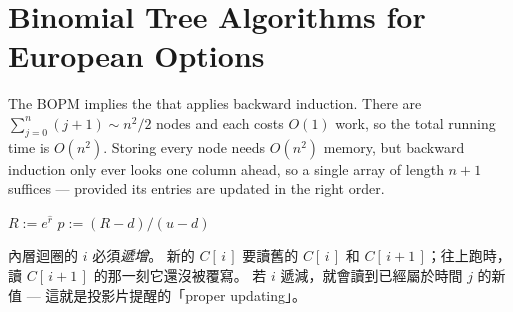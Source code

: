 \section{Binomial Tree Algorithms for European Options}
\label{sec:bopm-algorithms}


The BOPM implies the  that applies backward induction.
There are $\sum_{j=0}^{n}(j+1)\sim n^{2}/2$ nodes and each costs $O(1)$ work, so the total running time is $O(n^{2})$.
Storing every node needs $O(n^{2})$ memory, but backward induction only ever looks one column ahead, so a single array of length $n+1$ suffices --- provided its entries are updated in the right order.

\suppstart
\begin{algorithm}[H]
	\caption{Binomial tree algorithm for European calls, $O(n)$ space}
	\label{alg:bopm-european}
	$R:=e^{\hat{r}}$\;
	$p:=(R-d)/(u-d)$\;
	\;
\end{algorithm}

\begin{note}
	內層迴圈的 $i$ 必須\emph{遞增}。
	新的 $C[\,i\,]$ 要讀舊的 $C[\,i\,]$ 和 $C[\,i+1\,]$；往上跑時，讀 $C[\,i+1\,]$ 的那一刻它還沒被覆寫。
	若 $i$ 遞減，就會讀到已經屬於時間 $j$ 的新值 --- 這就是投影片提醒的「proper updating」。
\end{note}
\suppend

